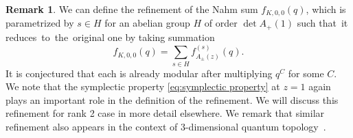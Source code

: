 \documentclass[pdftex]{sigma}
\numberwithin{equation}{section}
\theoremstyle{definition}
\newtheorem{Remark}[Theorem]{Remark}
\begin{document}
\begin{Remark}
 We can define the refinement  of the Nahm sum $f_{K,0,0} (q)$,
 which is parametrized by $s \in H$ for an abelian group $H$ of order $\det A_+ (1)$
 such that~it reduces~to~the~original one by taking summation \cite[Definition 5.12]{mizuno2020difference}
 \begin{equation*}
 f_{K,0,0} (q) = \sum_{s \in H} f_{A_\pm (z)}^{(s)} (q).
 \end{equation*}
 It is conjectured that each  is already
 modular after multiplying $q^C$ for some $C$.
 We note that the symplectic property \eqref{eq:symplectic property}
 at $z=1$ again plays an important role in the definition of the refinement.
 We will discuss this refinement for rank 2 case in more detail elsewhere.
 We remark that similar refinement also appears in the context of
 $3$-dimensional quantum topology~\cite[Section 6.3]{garoufalidis2021knots}.
\end{Remark}
\end{document}
